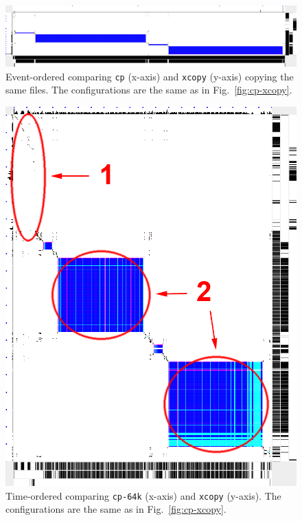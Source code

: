 \begin{figure}[tbh]
\begin{center}
\includegraphics[width=1.0\columnwidth]{lviz/cp-xvc.png}
\caption{Event-ordered \VDP{} comparing {\tt cp} (x-axis) and {\tt xcopy} (y-axis) copying
the same files. 
The configurations are the same as in Fig.~\ref{fig:cp-xcopy}.
}
\label{fig:cp-xvc}
\end{center}
\end{figure}
%
\begin{figure}[htb]
\begin{center}
\includegraphics[width=0.6\columnwidth]{lviz/cp-64k.png}
\caption{Time-ordered \VDP{} comparing {\tt cp-64k} (x-axis)
and {\tt xcopy} (y-axis).
The configurations are the same as in Fig.~\ref{fig:cp-xcopy}.
}
\label{fig:cp-64k}
\end{center}
\end{figure}

